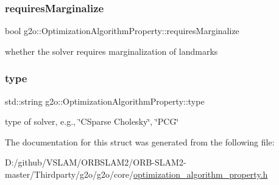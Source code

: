 \subsubsection{\texorpdfstring{requires\+Marginalize}{requiresMarginalize}}
{\footnotesize\ttfamily bool g2o\+::\+Optimization\+Algorithm\+Property\+::requires\+Marginalize}



whether the solver requires marginalization of landmarks 

\mbox{\label{structg2o_1_1_optimization_algorithm_property_a199f33f536f48f6ceda037f6a2ff206d}} 
\subsubsection{\texorpdfstring{type}{type}}
{\footnotesize\ttfamily std\+::string g2o\+::\+Optimization\+Algorithm\+Property\+::type}



type of solver, e.\+g., \char`\"{}\+C\+Sparse Cholesky\char`\"{}, \char`\"{}\+P\+C\+G\char`\"{} 



The documentation for this struct was generated from the following file\+:\begin{DoxyCompactItemize}
\item 
D\+:/github/\+V\+S\+L\+A\+M/\+O\+R\+B\+S\+L\+A\+M2/\+O\+R\+B-\/\+S\+L\+A\+M2-\/master/\+Thirdparty/g2o/g2o/core/\mbox{\hyperlink{optimization__algorithm__property_8h}{optimization\+\_\+algorithm\+\_\+property.\+h}}\end{DoxyCompactItemize}
